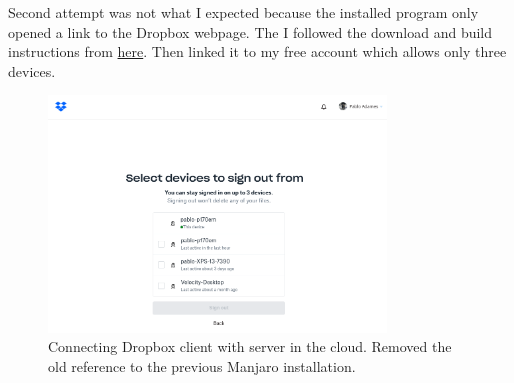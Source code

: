 \documentclass[]{scrartcl}
\begin{document}
	Second attempt was not what I expected because the installed program only opened a link to the Dropbox webpage.
	The I followed the download and build instructions from \href{https://help.dropbox.com/installs-integrations/desktop/linux-commands}{here}. 
	Then linked it to my free account which allows only three devices.
	
	\begin{figure}[!htb]
		\centering
		\caption{Connecting Dropbox client with server in the cloud. Removed the old reference to the previous Manjaro installation.}
		\includegraphics[width=0.8\textwidth]{Images/DropBoxSetUp.png}
	\end{figure}
	
	
	
\end{document}
